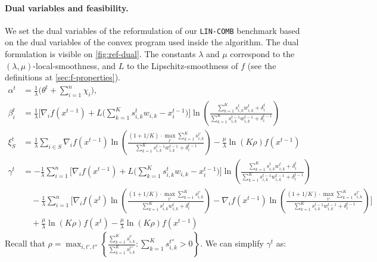\paragraph{Dual variables and feasibility.} We set the dual variables of the reformulation of our \texttt{LIN-COMB} benchmark based on the dual variables of the convex program used inside the algorithm. The dual formulation is visible on \cref{fig:ref-dual}. The constants $\lambda$ and $\mu$ correspond to the $(\lambda,\mu)$-local-smoothness, and $L$ to the Lipschitz-smoothness of $f$ (see the definitions at \cref{sec:f-properties}).
%
\begin{align*}
    \alpha^{t} &= \frac{1}{\lambda}  \biggl( \theta^{t} + \sum_{i=1}^{n} \chi_{i} \biggr), \\
    \beta_{i}^{t} &= \frac{1}{\lambda} \biggl[  \nabla_{i} f(x^{t-1}) + L\biggl( \sum_{k=1}^{K} s_{i,k}^{t} w_{i,k}  - x_{i}^{t-1} \biggr) \biggr] \ln \left( \frac{\sum_{k=1}^{K} s_{i,k}^{t} w_{i,k}^{t} + \delta_{i}^{t}}{\sum_{k=1}^{K}  s_{i,k}^{t-1}w_{i,k}^{t-1}  + \delta_{i}^{t-1}} \right) \\
    \xi_{S}^{t} &= \frac{1}{\lambda} \sum_{i \in S} \nabla_{i} f(x^{t-1}) \ln \left( \frac{(1 + 1/K) \cdot \max_{t'} \sum_{k=1}^{K} s_{i,k}^{t'}}{\sum_{k=1}^{K}  s_{i,k}^{t-1}w_{i,k}^{t-1}  + \delta_{i}^{t-1}} \right) - \frac{\mu}{\lambda} \ln(K\rho)  f(x^{t-1})\\
    \gamma^{t} &= -  \frac{1}{\lambda} \sum_{i=1}^{n} \biggl[  \nabla_{i} f(x^{t-1}) + L\biggl( \sum_{k=1}^{K} s_{i,k}^{t} w_{i,k}  - x_{i}^{t-1} \biggr) \biggr]  \ln \left( \frac{\sum_{k=1}^{K} s_{i,k}^{t} w_{i,k}^{t} + \delta_{i}^{t}}{\sum_{k=1}^{K}  s_{i,k}^{t-1}w_{i,k}^{t-1}  + \delta_{i}^{t-1}} \right) \\
        & \quad - \frac{1}{\lambda} \sum_{i=1}^{n} \biggl[ \nabla_{i} f(x^{t}) \ln \left( \frac{(1 + 1/K) \cdot \max_{t'} \sum_{k=1}^{K} s_{i,k}^{t'}}{\sum_{k=1}^{K}  s_{i,k}^{t}w_{i,k}^{t}  + \delta_{i}^{t}} \right) -  \nabla_{i} f(x^{t-1}) \ln \left( \frac{(1 + 1/K) \cdot \max_{t'} \sum_{k=1}^{K} s_{i,k}^{t'}}{\sum_{k=1}^{K}  s_{i,k}^{t-1}w_{i,k}^{t-1}  + \delta_{i}^{t-1}} \right) \biggr] \\
    & \quad + \frac{\mu}{\lambda} \ln(K\rho) f(x^{t}) - \frac{\mu}{\lambda} \ln(K\rho) f(x^{t-1})
\end{align*}
%
Recall that $\rho = \max_{i, t',t''} \left\{\frac{\sum_{k=1}^{K} s_{i,k}^{t'}}{\sum_{k=1}^{K} s_{i,k}^{t''}} : \sum_{k=1}^{K} s_{i,k}^{t''} > 0 \right\}$.
%
We can simplify $\gamma^{t}$ as:
